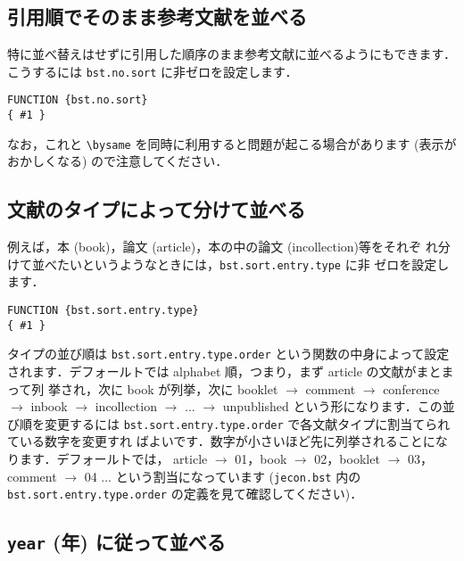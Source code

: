 \documentclass[a4j,10pt]{jarticle}
\begin{document}
\subsection{引用順でそのまま参考文献を並べる}

特に並べ替えはせずに引用した順序のまま参考文献に並べるようにもできます．
こうするには \texttt{bst.no.sort} に非ゼロを設定します．
\begin{screen}
\begin{verbatim}
FUNCTION {bst.no.sort}
{ #1 }
\end{verbatim}
\end{screen}

なお，これと \verb|\bysame| を同時に利用すると問題が起こる場合があります 
(表示がおかしくなる) ので注意してください．

\subsection{文献のタイプによって分けて並べる}

例えば，本 (book)，論文 (article)，本の中の論文 (incollection)等をそれぞ
れ分けて並べたいというようなときには，\texttt{bst.sort.entry.type} に非
ゼロを設定します．
\begin{screen}
\begin{verbatim}
FUNCTION {bst.sort.entry.type}
{ #1 }
\end{verbatim}
\end{screen}

タイプの並び順は \texttt{bst.sort.entry.type.order} という関数の中身によって設定
されます．デフォールトでは alphabet 順，つまり，まず article の文献がまとまって列
挙され，次に book が列挙，次に booklet $\rightarrow$ comment $\rightarrow$
conference $\rightarrow$ inbook $\rightarrow$ incollection $\rightarrow$
... $\rightarrow$ unpublished という形になります．この並び順を変更するには
\texttt{bst.sort.entry.type.order} で各文献タイプに割当てられている数字を変更すれ
ばよいです．数字が小さいほど先に列挙されることになります．デフォールトでは，
article $\rightarrow$ 01，book $\rightarrow$ 02，booklet $\rightarrow$ 03，
comment $\rightarrow$ 04 ... という割当になっています (\texttt{jecon.bst} 内の
\texttt{bst.sort.entry.type.order} の定義を見て確認してください)．

\subsection{\texttt{year} (年) に従って並べる}
\end{document}
